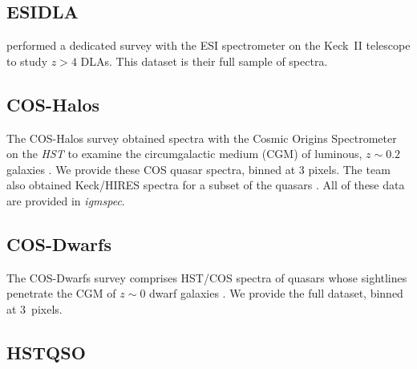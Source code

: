 \documentclass[12pt]{elsarticle}
\begin{document}
\subsection{ESIDLA}
\label{sec:esidla}

\cite{rafelski+12,rafelski+14} performed a dedicated survey
with the ESI spectrometer \citep{sbe+02} on the Keck~II telescope
to study $z>4$ DLAs.  This dataset is their
full sample of spectra.


\subsection{COS-Halos}
\label{sec:cos-halos}

The COS-Halos survey obtained spectra with the
Cosmic Origins Spectrometer 
\citep[COS;][]{cos} on the {\it HST}
to examine the circumgalactic medium (CGM) of luminous,
$z \sim 0.2$ galaxies \citep{tumlinson+13}.
We provide these COS quasar spectra, binned at 3 pixels.
The team also obtained Keck/HIRES spectra for a subset of the
quasars \citep{werk+13}.
All of these data are provided in {\it igmspec}.

\subsection{COS-Dwarfs}
\label{sec:cos-dwarfs}

The COS-Dwarfs survey comprises HST/COS spectra
of quasars whose sightlines penetrate the CGM of
$z \sim 0$ dwarf galaxies \citep{bordoloi14}.
We provide the full dataset, binned at 3~pixels.

%

\subsection{HSTQSO}
\label{sec:hstqso}
\end{document}
